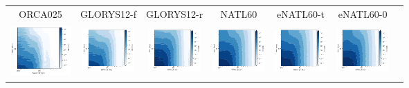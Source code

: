 \documentclass[draft]{agujournal2019}
\begin{document}
\begin{figure}[h]
\begin{minipage}{.80\linewidth}
\begin{subfigure}[t]{.9\linewidth}
\small
\begin{center}
\setlength{\tabcolsep}{1pt}

\begin{tabular}{ccccccc}

\hspace{0cm} ORCA025 & 
 GLORYS12-f & 
 GLORYS12-r & 
 NATL60 & 
 eNATL60-t & 
 eNATL60-0 & \\


\hspace{0cm}\includegraphics[trim={0 13mm 22mm 5mm},clip, width=2.3cm,height=2cm]{figures/plots/orca025_train_psd_spacetime.png} &
\includegraphics[trim={13mm 13mm 22mm 5mm},clip, width=2cm,height=2cm]{figures/plots/glorys12-f_train_psd_spacetime.png} &
\includegraphics[trim={13mm 13mm 22mm 5mm},clip, width=2cm,height=2cm]{figures/plots/glorys12-r_train_psd_spacetime.png} &
\includegraphics[trim={13mm 13mm 22mm 5mm},clip, width=2cm,height=2cm]{figures/plots/natl60_train_psd_spacetime.png} &
\includegraphics[trim={13mm 13mm 22mm 5mm},clip, width=2cm,height=2cm]{figures/plots/enatl60-t_train_psd_spacetime.png} &
\includegraphics[trim={13mm 13mm 22mm 5mm},clip, width=2cm,height=2cm]{figures/plots/enatl60-0_train_psd_spacetime.png} &
 \\


\end{tabular}
\end{center}
\end{subfigure}
\end{minipage}
\end{figure}
\end{document}
